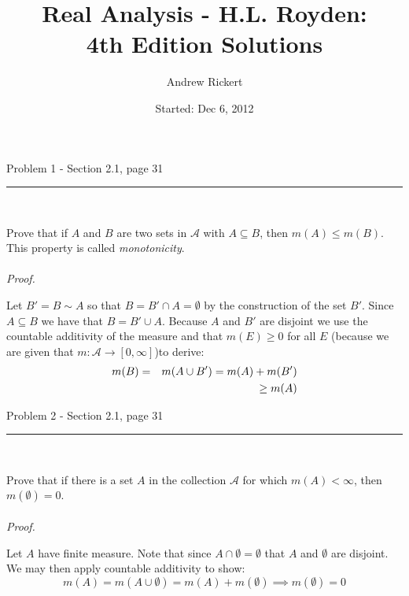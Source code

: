 \documentclass[11pt,reqno]{article}
\title{Real Analysis - H.L. Royden: \\  4th Edition Solutions}
\author{Andrew Rickert}
\date{Started: Dec 6, 2012}                                           %
\begin{document}
\maketitle



\begin{flushleft} 
Problem 1 - Section 2.1, page 31\\
\rule{500pt}{1pt}\\
\end{flushleft} 

Prove that if $A$ and $B$ are two sets in $\mathcal{A}$ with $A \subseteq B$, then $m(A) \le m(B)$. This property is called \emph{monotonicity}.
\\\\ \emph{Proof.}

Let $B' = B \sim A$ so that $B = B' \cap A = \emptyset$ by the construction of the set $B'$. Since $A \subseteq B$ we have that $B = B' \cup A$. Because $A$ and $B'$ are disjoint we use the countable additivity of the measure and that $m(E) \ge 0$ for all $E$ (because we are given that $m: \mathcal{A} \to [0,\infty]$)to derive:
\begin{eqnarray*}
m(B) &=& m(A \cup B') = m(A) + m(B') \\
        &&\hspace{53px}\ge m(A)
\end{eqnarray*}

\begin{flushleft} 
Problem 2 - Section 2.1, page 31\\
\rule{500pt}{1pt}\\
\end{flushleft} 

Prove that if there is a set $A$ in the collection $\mathcal{A}$ for which $m(A) < \infty$, then $m(\emptyset) = 0$.
\\\\ \emph{Proof.}

Let $A$ have finite measure. Note that since $A \cap \emptyset = \emptyset$ that $A$ and $\emptyset$ are disjoint. We may then apply countable additivity to show:
\begin{equation*}
m(A) = m(A \cup \emptyset) = m(A) + m(\emptyset) \implies m(\emptyset) = 0
\end{equation*}
\end{document}
